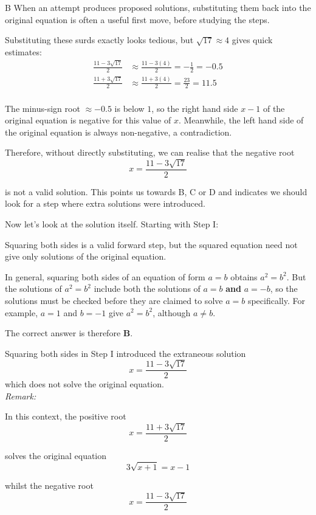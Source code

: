 \documentclass[11pt,a4paper]{article}
\begin{document}
\begin{enumerate}[label=\textbf{\arabic*.},leftmargin=*,itemsep=0pt,start=4]
\begin{djsSolution}{B}
When an attempt produces proposed solutions, substituting them back into the original equation is often a useful first move, before studying the steps. 

Substituting these surds exactly looks tedious, but $\sqrt{17}\approx4$ gives quick estimates:
\[
\begin{aligned}
\frac{11-3\sqrt{17}}{2}&\approx\frac{11-3(4)}{2}=-\frac12 = -0.5\\[8pt]
\frac{11+3\sqrt{17}}{2}&\approx\frac{11+3(4)}{2}=\frac{23}{2}=11.5\\
\end{aligned}
\]

The minus-sign root $\approx -0.5$ is below $1$, so the right hand side $x-1$ of the original equation is negative for this value of $x$. Meanwhile, the left hand side of the original equation is always non-negative, a contradiction.

Therefore, without directly substituting, we can realise that the negative root
\[ x = \frac{11-3\sqrt{17}}{2} \]

is not a valid solution. This points us towards B, C or D and indicates we should look for a step where extra solutions were introduced.

Now let's look at the solution itself. Starting with Step I:

Squaring both sides is a valid forward step, but the squared equation need not give only solutions of the original equation. 

In general, squaring both sides of an equation of form $a=b$ obtains $a^2=b^2$. But the solutions of $a^2=b^2$ include both the solutions of $a=b$ \textbf{and} $a=-b$, so the solutions must be checked before they are claimed to solve $a=b$ specifically. For example, $a=1$ and $b=-1$ give $a^2=b^2$, although $a\ne b$.

The correct answer is therefore \textbf{B}. 

Squaring both sides in Step I introduced the extraneous solution \[x=\frac{11-3\sqrt{17}}{2}\] 
which does not solve the original equation. \\[5pt]

\textit{Remark:}

In this context, the positive root 
\[x=\frac{11+3\sqrt{17}}{2}\]

solves the original equation
\[ 3\sqrt{x+1}=x-1 \]

whilst the negative root 
\[x=\frac{11-3\sqrt{17}}{2}\]


\end{djsSolution}
\end{enumerate}
\end{document}
